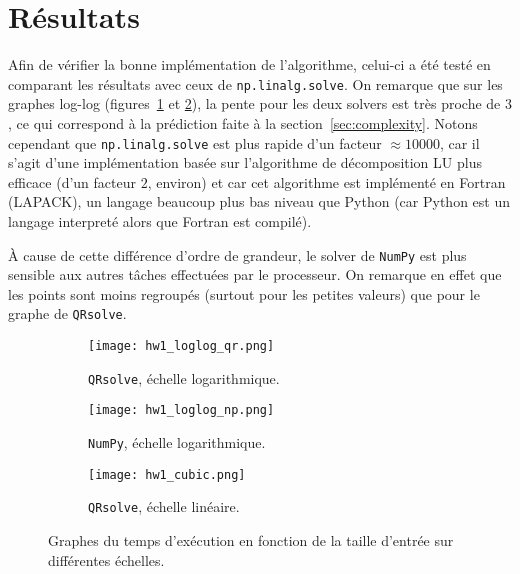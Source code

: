 \documentclass[11pt]{article}
\begin{document}
\section{Résultats}
Afin de vérifier la bonne implémentation de l'algorithme,
celui-ci a été testé en comparant les résultats avec ceux de \texttt{np.linalg.solve}.
On remarque que sur les graphes log-log (figures~\ref{fig:llqr} et \ref{fig:llnp}),
la pente pour les deux solvers est très proche de $3$,
ce qui correspond à la prédiction faite à la section~\ref{sec:complexity}.
Notons cependant que \texttt{np.linalg.solve} est plus rapide d'un facteur $\approx \num{10000}$,
car il s'agit d'une implémentation basée sur l'algorithme de décomposition LU plus efficace (d'un facteur $2$, environ)
et car cet algorithme est implémenté en Fortran (LAPACK), un langage beaucoup plus bas niveau que Python (car Python est un langage interpreté alors que Fortran est compilé).

À cause de cette différence d'ordre de grandeur, le solver de \texttt{NumPy} est plus sensible aux autres tâches effectuées par le processeur.
On remarque en effet que les points sont moins regroupés (surtout pour les petites valeurs) que pour le graphe de \texttt{QRsolve}.

\begin{figure}[H]
	\centering
	\begin{subfigure}{0.33\textwidth}
		\centering
		\texttt{[image: hw1\_loglog\_qr.png]}
		\caption{\texttt{QRsolve}, échelle logarithmique.}
		\label{fig:llqr}
	\end{subfigure}%
	\begin{subfigure}{0.33\textwidth}
		\centering
		\texttt{[image: hw1\_loglog\_np.png]}
		\caption{\texttt{NumPy}, échelle logarithmique.}
		\label{fig:llnp}
	\end{subfigure}
	\begin{subfigure}{0.33\textwidth}
		\centering
		\texttt{[image: hw1\_cubic.png]}
		\caption{\texttt{QRsolve}, échelle linéaire.}
		\label{fig:cubic}
	\end{subfigure}
	\caption{Graphes du temps d'exécution en fonction de la taille d'entrée sur différentes échelles.}
	\label{fig:manmade}
\end{figure}
\end{document}
